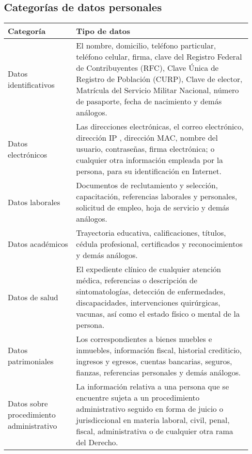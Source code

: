 \subsection{Categorías de datos personales}
\begin{center}
\begin{longtable}{|p{4cm}|p{10cm}|} \hline
     {Categoría} & {Tipo de datos} \\ \hline \hline
     Datos identificativos & El nombre, domicilio, teléfono particular, teléfono celular, firma, clave del Registro Federal de Contribuyentes (RFC), Clave Única de Registro de Población (CURP), Clave de elector, Matrícula del Servicio Militar Nacional, número de pasaporte, fecha de nacimiento y demás análogos.  \\ \hline
     
     Datos electrónicos  & Las direcciones electrónicas, el correo electrónico, dirección IP , dirección MAC,  nombre del usuario, contraseñas, firma electrónica; o cualquier otra información empleada por la persona, para su identificación en Internet.  \\  \hline
     
     Datos laborales & Documentos de reclutamiento y selección, capacitación, referencias laborales y personales, solicitud de empleo, hoja de servicio y demás análogos.\\  \hline
     
     Datos académicos & Trayectoria educativa, calificaciones, títulos, cédula profesional, certificados y reconocimientos y demás análogos.\\  \hline
     
     Datos de salud & El expediente clínico de cualquier atención médica, referencias o descripción de sintomatologías, detección de enfermedades, discapacidades, intervenciones quirúrgicas, vacunas,  así como el estado físico o mental de la persona. \\  \hline
     
     Datos patrimoniales & Los correspondientes a bienes muebles e inmuebles, información fiscal, historial crediticio, ingresos y egresos, cuentas bancarias, seguros, fianzas, referencias personales y demás análogos. \\  \hline
     Datos sobre procedimiento administrativo &  La información relativa a una persona que se encuentre sujeta a un procedimiento administrativo seguido en forma de juicio o jurisdiccional en materia laboral, civil, penal, fiscal, administrativa o de cualquier otra rama del Derecho. \\  \hline
     

\end{longtable}
\end{center}

